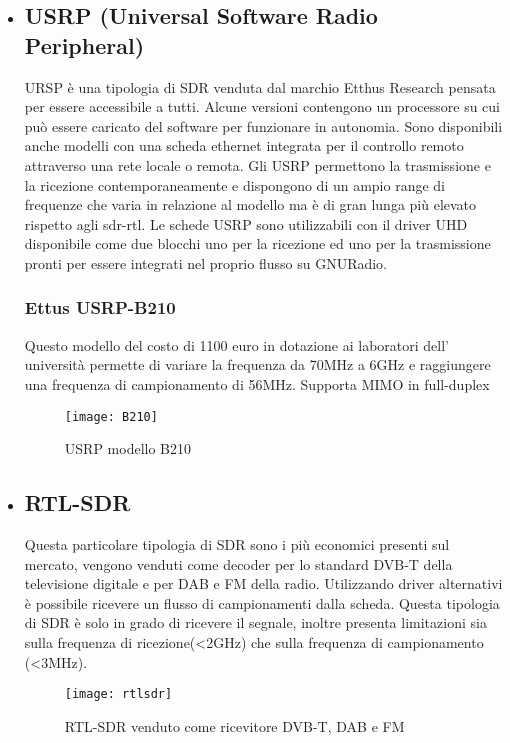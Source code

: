 \begin{itemize}
\item \subsection{USRP (Universal Software Radio Peripheral)} URSP è una tipologia di SDR venduta dal marchio Etthus Research pensata per essere accessibile a tutti. Alcune versioni contengono un processore su cui può essere caricato del software per funzionare in autonomia. Sono disponibili anche modelli con una scheda ethernet integrata per il controllo remoto attraverso una rete locale o remota. Gli USRP permettono la trasmissione e la ricezione contemporaneamente e dispongono di un ampio range di frequenze che varia in relazione al modello ma è di gran lunga più elevato rispetto agli sdr-rtl. Le schede USRP sono utilizzabili con il driver UHD disponibile come due blocchi uno per la ricezione ed uno per la trasmissione pronti per essere integrati nel proprio flusso su GNURadio.
\subsubsection{Ettus USRP-B210}
Questo modello del costo di 1100 euro in dotazione ai laboratori dell' università permette di variare la frequenza da 70MHz a 6GHz e raggiungere una frequenza di campionamento di 56MHz. Supporta MIMO in full-duplex
\begin{figure}[h]
	\centering
	\texttt{[image: B210]}
	\caption{USRP modello B210\cite{b210}}\label{fig:1}
\end{figure}


\item \subsection{RTL-SDR} Questa particolare tipologia di SDR sono i più economici presenti sul mercato, vengono venduti come decoder per lo standard DVB-T della televisione digitale e per DAB e FM della radio. Utilizzando driver alternativi è possibile ricevere un flusso di campionamenti dalla scheda. Questa tipologia di SDR è solo in grado di ricevere il segnale, inoltre presenta limitazioni sia sulla frequenza di ricezione(<2GHz) che sulla frequenza di campionamento (<3MHz).
\begin{figure}[h]
	\centering
	\texttt{[image: rtlsdr]}
	\caption{RTL-SDR venduto come ricevitore DVB-T, DAB e FM\cite{rtlsdr}}\label{fig:1}
\end{figure}


\end{itemize}
